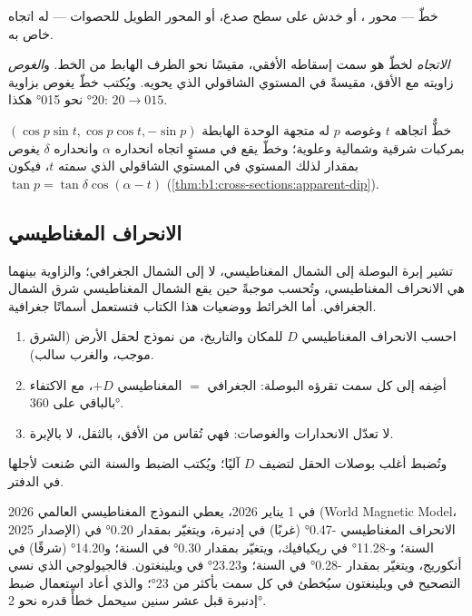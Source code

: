 خطّ --- محور ، أو خدش على سطح صدع، أو المحور الطويل للحصوات --- له اتجاه خاص به.

\begin{definition}\label{def:b1:field-lab-methods-1:trend-plunge}
\emph{الاتجاه} لخطّ هو سمت إسقاطه الأفقي، مقيسًا نحو الطرف الهابط من الخط. و\emph{الغوص} زاويته مع الأفق، مقيسةً في المستوي الشاقولي الذي يحويه. ويُكتب خطّ يغوص بزاوية \ang{20} نحو \ang{015} هكذا: $20\to015$.
\end{definition}

خطٌّ اتجاهه $t$ وغوصه $p$ له متجهة الوحدة الهابطة $(\cos p\sin t, \cos p\cos t, -\sin p)$ بمركبات شرقية وشمالية وعلوية؛ وخطّ يقع في مستوٍ اتجاه انحداره $\alpha$ وانحداره $\delta$ يغوص بمقدار  لذلك المستوي في المستوي الشاقولي الذي سمته $t$، فيكون
$\tan p = \tan\delta\cos(\alpha - t)$ (\cref{thm:b1:cross-sections:apparent-dip}).

\subsection{الانحراف المغناطيسي}

تشير إبرة البوصلة إلى الشمال المغناطيسي، لا إلى الشمال الجغرافي؛ والزاوية بينهما هي الانحراف المغناطيسي، وتُحسب موجبةً حين يقع الشمال المغناطيسي شرق الشمال الجغرافي. أما الخرائط ووضعيات هذا الكتاب فتستعمل أسماتًا جغرافية.

\begin{method}\label{met:b1:field-lab-methods-1:declination}
\begin{enumerate}
  \item احسب الانحراف المغناطيسي $D$ للمكان والتاريخ، من نموذج لحقل الأرض (الشرق موجب، والغرب سالب).
  \item أضِفه إلى كل سمت تقرؤه البوصلة:  الجغرافي $=$  المغناطيسي $+ D$، مع الاكتفاء بالباقي على \ang{360}.
  \item لا تعدّل الانحدارات والغوصات: فهي تُقاس من الأفق، بالثقل، لا بالإبرة.
\end{enumerate}
وتُضبط أغلب بوصلات الحقل لتضيف $D$ آليًا؛ ويُكتب الضبط والسنة التي صُنعت لأجلها في الدفتر.
\end{method}

\begin{dated}{2026}
في 1 يناير 2026، يعطي النموذج المغناطيسي العالمي (World Magnetic Model، الإصدار 2025) الانحراف المغناطيسي \ang{-0.47} (غربًا) في إدنبرة، ويتغيّر بمقدار \ang{+0.20} في السنة؛ و\ang{-11.28} في ريكيافيك، ويتغيّر بمقدار \ang{+0.30} في السنة؛ و\ang{+14.20} (شرقًا) في أنكوريج، ويتغيّر بمقدار \ang{-0.28} في السنة؛ و\ang{+23.23} في ويلينغتون. فالجيولوجي الذي نسي التصحيح في ويلينغتون سيُخطئ في كل سمت بأكثر من \ang{23}؛ والذي أعاد استعمال ضبط إدنبرة قبل عشر سنين سيحمل خطأً قدره نحو \ang{2}.
\end{dated}

